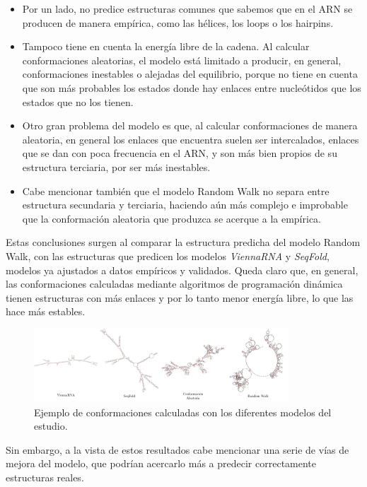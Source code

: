 \documentclass[a4paper,11pt,titlepage]{article}
\theoremstyle{definition}
\begin{document}
\begin{itemize}
    \item Por un lado, no predice estructuras comunes que sabemos que en el ARN se producen de manera empírica, como las hélices, los loops o los hairpins.
    \item Tampoco tiene en cuenta la energía libre de la cadena. Al calcular conformaciones aleatorias, el modelo está limitado a producir, en general, conformaciones inestables o alejadas del equilibrio, porque no tiene en cuenta que son más probables los estados donde hay enlaces entre nucleótidos que los estados que no los tienen.
    \item Otro gran problema del modelo es que, al calcular conformaciones de manera aleatoria, en general los enlaces que encuentra suelen ser intercalados, enlaces que se dan con poca frecuencia en el ARN, y son más bien propios de su estructura terciaria, por ser más inestables.
    \item Cabe mencionar también que el modelo Random Walk no separa entre estructura secundaria y terciaria, haciendo aún más complejo e improbable que la conformación aleatoria que produzca se acerque a la empírica.
\end{itemize}

Estas conclusiones surgen al comparar la estructura predicha del modelo Random Walk, con las estructuras que predicen los modelos \textit{ViennaRNA} y \textit{SeqFold}, modelos ya ajustados a datos empíricos y validados. Queda claro que, en general, las conformaciones calculadas mediante algoritmos de programación dinámica tienen estructuras con más enlaces y por lo tanto menor energía libre, lo que las hace más estables. 

\begin{figure}[H]
    \centering
    \includegraphics[width=0.85\textwidth]{images/RNA_conformations.png}
    \small{\caption{Ejemplo de conformaciones calculadas con los diferentes modelos del estudio.}\label{fig:RNA_conformations}}\normalsize
\end{figure}

Sin embargo, a la vista de estos resultados cabe mencionar una serie de vías de mejora del modelo, que podrían acercarlo más a predecir correctamente estructuras reales.
\end{document}
